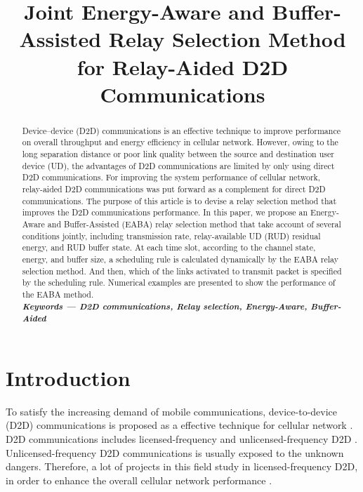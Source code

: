 \documentclass[conference]{IEEEtran}
\begin{document}
\title{Joint Energy-Aware and Buffer-Assisted Relay Selection Method for Relay-Aided D2D Communications}

\author{
}


\maketitle
\begin{abstract}
Device--device (D2D) communications is an effective technique to improve performance on overall throughput and energy efficiency in cellular network. However, owing to the long separation distance or poor link quality between the source and destination user device (UD), the advantages of D2D communications are limited by only using direct D2D communications. For improving the system performance of cellular network, relay-aided D2D communications was put forward as a complement for direct D2D communications. The purpose of this article is to devise a relay selection method that improves the D2D communications performance. In this paper, we propose an Energy-Aware and Buffer-Assisted (EABA) relay selection method that take account of several conditions jointly, including transmission rate, relay-available UD (RUD) residual energy, and RUD buffer state. At each time slot, according to the channel state, energy, and buffer size, a scheduling rule is calculated dynamically by the EABA relay selection method. And then, which of the links activated to transmit packet is specified by the scheduling rule. Numerical examples are presented to show the performance of the EABA method.
\\
\textbf {\small \emph{Keywords --- D2D communications, Relay selection, Energy-Aware, Buffer-Aided}}
\end{abstract}

\IEEEpeerreviewmaketitle
\section{Introduction}
To satisfy the increasing demand of mobile communications, device-to-device (D2D) communications is proposed as a effective technique for cellular network \cite{5350367,7949342,7254241}. D2D communications includes licensed-frequency and unlicensed-frequency D2D \cite{7128330}. Unlicensed-frequency D2D communications is usually exposed to the unknown dangers. Therefore, a lot of projects in this field study in licensed-frequency D2D, in order to enhance the overall cellular network performance \cite{7878672,7504380,7742334}.
\end{document}
